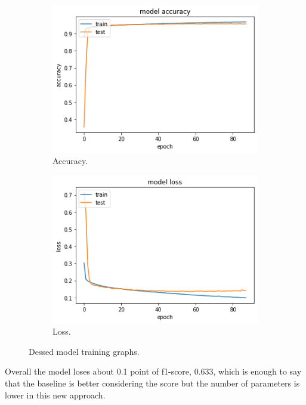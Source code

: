 \documentclass{article}
\begin{document}
\begin{figure}[H]
	\centering
	\begin{subfigure}{.5\textwidth}
		\centering
		\includegraphics[width=.9\linewidth]{./images/poly/dessed_acc.png}
		\caption{Accuracy.}
	\end{subfigure}%
	\begin{subfigure}{.5\textwidth}
		\centering
		\includegraphics[width=.9\linewidth]{./images/poly/dessed_loss.png}
		\caption{Loss.}
	\end{subfigure}
	\caption{Dessed model training graphs.}
	\label{fig:poly_des_result}
\end{figure}

Overall the model loses about 0.1 point of f1-score, 0.633, which is enough to say that the baseline is better considering the score but the number of parameters is lower in this new approach. 
\end{document}
